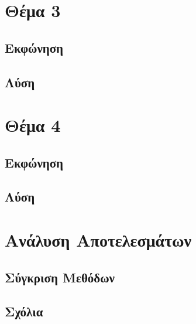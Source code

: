 \documentclass[twocolumn]{report}
\begin{document}
\chapter{Θέμα 3}
\section{Εκφώνηση}

\section{Λύση}


\chapter{Θέμα 4}
\section{Εκφώνηση}

\section{Λύση}


\chapter{Ανάλυση Αποτελεσμάτων}
\section{Σύγκριση Μεθόδων}

\section{Σχόλια}


\nocite{*} %


\end{document}
